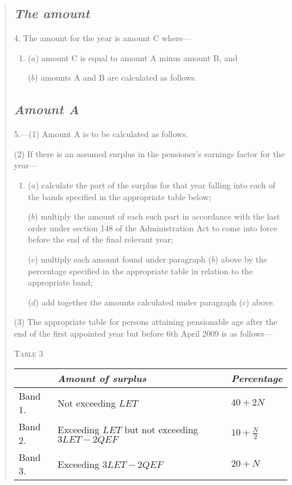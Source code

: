 \documentclass[12pt,a4paper]{article}
\begin{document}
\begin{quotation}
\subsection*{\itshape The amount}

4. The amount for the year is amount C where—
\begin{enumerate}\item[]
($a$) amount C is equal to amount A minus amount B, and

($b$) amounts A and B are calculated as follows.
\end{enumerate}

\subsection*{\itshape Amount A}

5.---(1) Amount A is to be calculated as follows.

(2) If there is an assumed surplus in the pensioner’s earnings factor for the year—
\begin{enumerate}\item[]
($a$) calculate the part of the surplus for that year falling into each of the bands specified in the appropriate table below;

($b$) multiply the amount of each such part in accordance with the last order under section 148 of the Administration Act to come into force before the end of the final relevant year;

($c$) multiply each amount found under paragraph ($b$)  above by the percentage specified in the appropriate table in relation to the appropriate band;

($d$) add together the amounts calculated under paragraph ($c$)  above.
\end{enumerate}

(3) The appropriate table for persons attaining pensionable age after the end of the first appointed year but before 6th April 2009 is as follows—

\pagebreak[3]

\noindent\textsc{Table 3}

{\noindent\footnotesize
\begin{longtable}{lll}
\hline
&\itshape Amount of surplus	&\itshape Percentage\\
\hline
\endhead
\hline
\endlastfoot
Band 1. 	&Not exceeding $LET$	&$40 + 2N$\\
Band 2. 	&Exceeding $LET$ but not exceeding $3LET - 2QEF$	&$10 + \frac{N}{2}$\\
Band 3. 	&Exceeding $3LET - 2QEF$	&$20 + N$\\
\end{longtable}

}
\end{quotation}
\end{document}
